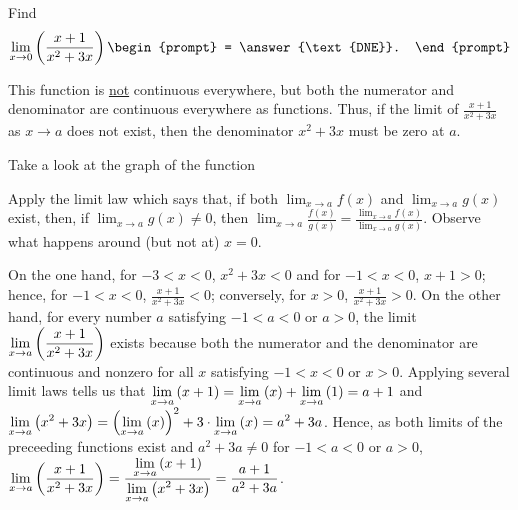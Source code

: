 \documentclass{ximera}
\author{Gregory Hartman \and Matthew Carr}
\begin{document}
\begin{exercise}



  Find 
  \[
  \lim_{x\to0} \p{\frac{x+1}{x^2+3x}}
  \begin{prompt}
  = \answer{\text{DNE}}.
  \end{prompt}
  \]
    \begin{hint}
      This function is \underline{not} continuous everywhere, but both the numerator and denominator are continuous everywhere as functions. Thus, if the limit of $\frac{x+1}{x^2+3x}$ as $x\to a$ does not exist, then the denominator $x^2+3x$ must be zero at $a$.
    \end{hint}
     \begin{hint}
    Take a look at the graph of the function
    \begin{center}
      \end{center}
     Apply the limit law which says that, if both $\lim_{x\to a}f(x)$ and $\lim_{x\to a}g(x)$ exist, then, if $\lim_{x\to a}g(x)\ne0$, then $\lim_{x\to{a}}\frac{f(x)}{g(x)}=\frac{\lim_{x\to a}f(x)}{\lim_{x\to{a}}g(x)}$. Observe what happens around (but not at) $x=0$.
    \end{hint}
    \begin{hint}
     On the one hand, for $-3<x<0$, $x^2+3x<0$ and for $-1<x<0$, $x+1>0$; hence, for $-1<x<0$, $\frac{x+1}{x^2+3x}<0$; conversely, for $x>0$, $\frac{x+1}{x^2+3x}>0$. On the other hand, for every number $a$ satisfying $-1<a<0$ or $a>0$, the limit  $\lim_{x\to a}\p{\frac{x+1}{x^2+3x}}$ exists because both the numerator and the denominator are continuous and nonzero for all $x$ satisfying $-1<x<0$ or $x>0$. Applying several limit laws tells us that $\lim_{x\to a}\p{x+1}=\lim_{x\to a}\p{x}+\lim_{x\to a}\p{1}=a+1$ and $\lim_{x\to a}\p{x^2+3x}=\left(\lim_{x\to a}\p{x}\right)^2+3\cdot\lim_{x\to a}\p{x}=a^2+3a$. Hence, as both limits of the preceeding functions exist and $a^2+3a\ne0$ for $-1<a<0$ or $a>0$, $\lim_{x\to a}\p{\frac{x+1}{x^2+3x}}=\frac{\lim_{x\to a}\p{x+1}}{\lim_{x\to a}\p{x^2+3x}}=\frac{a+1}{a^2+3a}$.
     

\end{hint}
\end{exercise}
\end{document}
